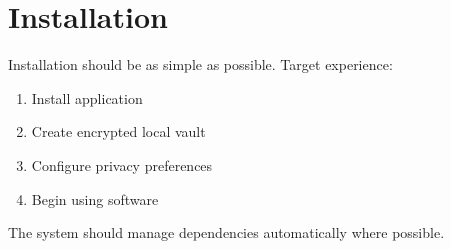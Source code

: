 
\chapter{Installation}
Installation should be as simple as possible.
Target experience:

\begin{enumerate}
	\item Install application
	\item Create encrypted local vault
	\item Configure privacy preferences
	\item Begin using software
\end{enumerate}

The system should manage dependencies automatically where possible.

\sentinelchapterend
